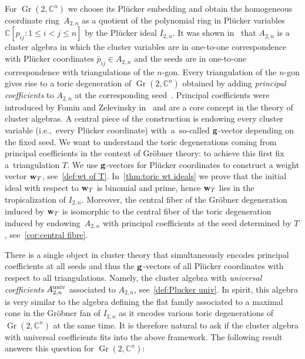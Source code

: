 \documentclass[10pt,a4paper]{amsart}
\newcommand{\thref}[1]{\ref{#1}}
\numberwithin{equation}{section}
\DeclareMathOperator{\Gr}{Gr}
\begin{document}
 For $\Gr(2,\mathbb C^n)$ we choose its Pl\"ucker embedding and obtain the homogeneous coordinate ring~$A_{2,n}$ as a quotient of the polynomial ring in Pl\"ucker variables $\mathbb C[p_{ij}\colon 1\le i<j\le n]$ by the Pl\"ucker ideal $I_{2,n}$.
It was shown in~\cite{FZ02} that $A_{2,n}$ %
is a cluster algebra in which the cluster variables are in one-to-one correspondence with Pl\"ucker coordinates $\bar p_{ij}\in A_{2,n}$ and the
seeds are in one-to-one correspondence with triangulations of the $n$-gon.
Every triangulation of the $n$-gon gives rise to a toric degeneration of $\Gr(2,\mathbb C^n)$ obtained by adding {\it principal coefficients} to $A_{2,n}$ at the corresponding seed~\cite{GHKK}.
Principal coefficients were introduced by Fomin and Zelevinsky in~\cite{FZ_clustersIV} and are a core concept in the theory of cluster algebras.
A central piece of the construction is endowing every cluster variable (i.e.,~every Pl\"ucker coordinate) with~a~so-called ${\bf g}$-vector depending on the fixed seed.
We want to understand the toric degenerations coming from principal coefficients in the context of Gr\"obner theory:
to achieve this first fix a~triangulation $T$.
We use ${\bf g}$-vectors for Pl\"ucker coordinates to construct a weight vector ${\bf w}_T$, see~\thref{def:wt of T}.
In~\thref{thm:toric wt ideals} we prove that the initial ideal with respect to ${\bf w}_T$ is binomial and prime, hence ${\bf w}_T$ lies in the tropicalization of $I_{2,n}$.
Moreover, the central fiber of the Gr\"obner degeneration induced by ${\bf w}_T$ is isomorphic to the central fiber of the toric degeneration induced by endowing~$A_{2,n}$ with principal coefficients at the seed determined by $T$, see~\thref{cor:central fibre}.


There is a single object in cluster theory that simultaneously encodes principal coefficients at all seeds and thus the ${\bf g}$-vectors of all Pl\"ucker coordinates with respect to all triangulations.
Namely, the cluster algebra with {\it universal coefficients} $A^{\rm univ}_{2,n}$ associated to $A_{2,n}$, see~\thref{def:Plucker univ}.
In spirit, this algebra is very similar to the algebra defining the flat family associated to a maximal cone in the Gr\"obner fan of $I_{2,n}$ as it encodes various toric degenerations of $\Gr(2,\mathbb C^n)$ at the same time.
It is therefore natural to ask if the cluster algebra with universal coefficients fits into the above framework.
The following result answers this question %
for $\Gr(2,\mathbb C^n)$:
\end{document}
